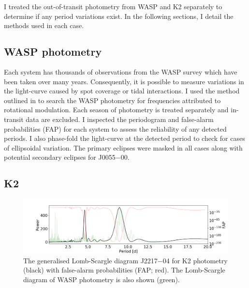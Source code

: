 I treated the out-of-transit photometry from WASP and K2 separately to determine if any period variations exist. In the following sections, I detail the methods used in each case.

\subsection{WASP photometry}

Each system has thousands of observations from the WASP survey which have been taken over many years. Consequently, it is possible to measure variations in the light-curve caused by spot coverage or tidal interactions. I used the method outlined in \citet{2011PASP..123..547M} to search the WASP photometry for frequencies attributed to rotational modulation. Each season of photometry is treated separately and in-transit data are excluded. I inspected the periodogram and false-alarm probabilities (FAP) for each system to assess the reliability of any detected periods. I also phase-fold the light-curve at the detected period to check for cases of ellipsoidal variation. The primary eclipses were masked in all cases along with potential secondary eclipses for J0055$-$00.

\subsection{K2}

\begin{figure}
    \centering
    \includegraphics[scale=0.4]{7-images/J2217-04_period.png}
    \caption{The generalised Lomb-Scargle diagram J2217$-$04 for K2 photometry (black) with false-alarm probabilities (FAP; red). The Lomb-Scargle diagram of WASP photometry is also shown (green).  }
    \label{methods:fig:J2217-04_lomb}
\end{figure}

